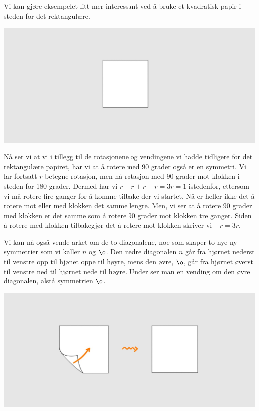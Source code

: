 Vi kan gjøre eksempelet litt mer interessant ved å bruke et kvadratisk papir i steden for det rektangulære.

\begin{center}
\includegraphics[width=\textwidth]{img/identity2.jpg}
\end{center}

Nå ser vi at vi i tillegg til de rotasjonene og vendingene vi hadde tidligere for det rektangulære papiret, 
har vi at å rotere med 90 grader også er en symmetri. 
Vi lar fortsatt $r$ betegne rotasjon, 
men nå rotasjon med 90 grader mot klokken i steden for 180 grader. 
Dermed har vi $r+r+r+r=3r=1$ istedenfor, 
ettersom vi må rotere fire ganger for å komme tilbake der vi startet. 
Nå er heller ikke det å rotere mot eller med klokken det samme lengre. 
Men, vi ser at å rotere 90 grader med klokken er det samme som å rotere 90 grader mot klokken tre ganger. 
Siden å rotere med klokken tilbakegjør det å rotere mot klokken skriver vi $-r = 3r$. 

Vi kan nå også vende arket om de to diagonalene, 
noe som skaper to nye ny symmetrier som vi kaller $n$ og $\o$. 
Den nedre diagonalen $n$ går fra hjørnet nederst til venstre opp til hjønet oppe til høyre, 
mens den øvre, $\o$, 
går fra hjørnet øverst til venstre ned til hjørnet nede til høyre. 
Under ser man en vending om den øvre diagonalen, 
alstå symmetrien $\o$.  

\begin{center}
\includegraphics[width=\textwidth]{img/diagonal.jpg}
\end{center}

